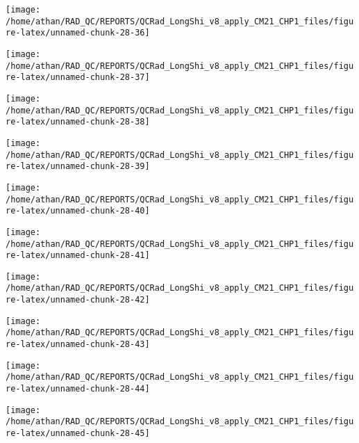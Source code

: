 \documentclass[
  10pt,
  a4paper,oneside]{article}
\begin{document}
\begin{center}\texttt{[image: /home/athan/RAD\_QC/REPORTS/QCRad\_LongShi\_v8\_apply\_CM21\_CHP1\_files/figure-latex/unnamed-chunk-28-36]} \end{center}

\begin{center}\texttt{[image: /home/athan/RAD\_QC/REPORTS/QCRad\_LongShi\_v8\_apply\_CM21\_CHP1\_files/figure-latex/unnamed-chunk-28-37]} \end{center}

\begin{center}\texttt{[image: /home/athan/RAD\_QC/REPORTS/QCRad\_LongShi\_v8\_apply\_CM21\_CHP1\_files/figure-latex/unnamed-chunk-28-38]} \end{center}

\begin{center}\texttt{[image: /home/athan/RAD\_QC/REPORTS/QCRad\_LongShi\_v8\_apply\_CM21\_CHP1\_files/figure-latex/unnamed-chunk-28-39]} \end{center}

\begin{center}\texttt{[image: /home/athan/RAD\_QC/REPORTS/QCRad\_LongShi\_v8\_apply\_CM21\_CHP1\_files/figure-latex/unnamed-chunk-28-40]} \end{center}

\begin{center}\texttt{[image: /home/athan/RAD\_QC/REPORTS/QCRad\_LongShi\_v8\_apply\_CM21\_CHP1\_files/figure-latex/unnamed-chunk-28-41]} \end{center}

\begin{center}\texttt{[image: /home/athan/RAD\_QC/REPORTS/QCRad\_LongShi\_v8\_apply\_CM21\_CHP1\_files/figure-latex/unnamed-chunk-28-42]} \end{center}

\begin{center}\texttt{[image: /home/athan/RAD\_QC/REPORTS/QCRad\_LongShi\_v8\_apply\_CM21\_CHP1\_files/figure-latex/unnamed-chunk-28-43]} \end{center}

\begin{center}\texttt{[image: /home/athan/RAD\_QC/REPORTS/QCRad\_LongShi\_v8\_apply\_CM21\_CHP1\_files/figure-latex/unnamed-chunk-28-44]} \end{center}

\begin{center}\texttt{[image: /home/athan/RAD\_QC/REPORTS/QCRad\_LongShi\_v8\_apply\_CM21\_CHP1\_files/figure-latex/unnamed-chunk-28-45]} \end{center}
\end{document}
